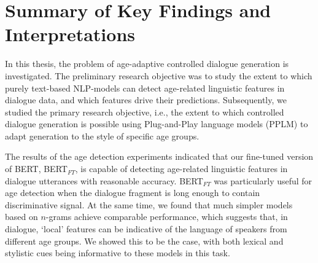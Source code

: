 \section{Summary of Key Findings and Interpretations}

In this thesis, the problem of age-adaptive controlled dialogue generation is investigated. The preliminary research objective was to study the extent to which purely text-based NLP-models can detect age-related linguistic features in dialogue data, and which features drive their predictions. Subsequently, we studied the primary research objective, i.e., the extent to which controlled dialogue generation is possible using Plug-and-Play language models (PPLM) \citep{dathathri2019plug} to adapt generation to the style of specific age groups.

The results of the age detection experiments indicated that our fine-tuned version of BERT, BERT$_{FT}$, is capable of detecting age-related linguistic features in dialogue utterances with reasonable accuracy. BERT$_{FT}$ was particularly useful for age detection when the dialogue fragment is long enough to contain discriminative signal. At the same time, we found that much simpler models based on $n$-grams achieve comparable performance, which suggests that, in dialogue, ‘local’ features can be indicative of the language of speakers from different age groups. We showed this to be the case, with both lexical and stylistic cues being informative to these models in this task.




